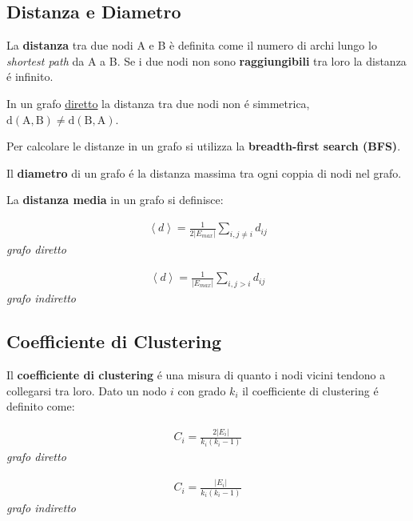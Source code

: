 \subsection*{Distanza e Diametro}
La \textbf{distanza} tra due nodi A e B è definita come il numero di archi lungo lo \textit{shortest path} da A a B.
Se i due nodi non sono \textbf{raggiungibili} tra loro la distanza é infinito.

In un grafo \underline{diretto} la distanza tra due nodi non é simmetrica, $\text{d}(\text{A}, \text{B}) \not= \text{d}(\text{B}, \text{A})$.

Per calcolare le distanze in un grafo si utilizza la \textbf{breadth-first search (BFS)}.

Il \textbf{diametro} di un grafo é la distanza massima tra ogni coppia di nodi nel grafo.

La \textbf{distanza media} in un grafo si definisce:

\begin{minipage}{0.45\textwidth}
  \centering

  \begin{align*}
    \left\langle d \right\rangle = \frac{1}{2|E_{max}|} \sum_{i, j\not=i} d_{ij}
  \end{align*}
  \small\textit{grafo diretto}
\end{minipage}
\hfill
\begin{minipage}{0.45\textwidth}
  \centering

  \begin{align*}
    \left\langle d \right\rangle = \frac{1}{|E_{max}|} \sum_{i, j>i} d_{ij}
  \end{align*}
  \small\textit{grafo indiretto}
\end{minipage}

\subsection*{Coefficiente di Clustering}
Il \textbf{coefficiente di clustering} é una misura di quanto i nodi vicini tendono a collegarsi tra loro.
Dato un nodo $i$ con grado $k_i$ il coefficiente di clustering é definito come:

\begin{minipage}{0.45\textwidth}
  \centering

  \begin{align*}
    C_i = \frac{2|E_i|}{k_i (k_i - 1)}
  \end{align*}
  \small\textit{grafo diretto}
\end{minipage}
\hfill
\begin{minipage}{0.45\textwidth}
  \centering
  \begin{align*}
    C_i = \frac{|E_i|}{k_i (k_i - 1)}
  \end{align*}
  \small\textit{grafo indiretto}
\end{minipage}

